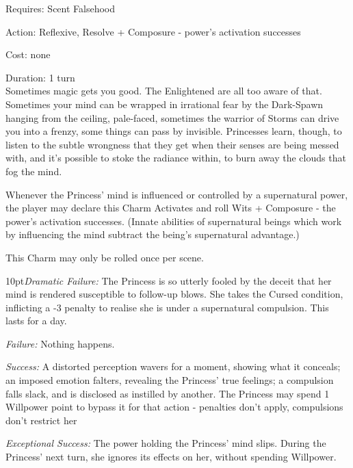 \noindent Requires: Scent Falsehood

\noindent Action: Reflexive, Resolve + Composure - power's activation successes

\noindent Cost: none

\noindent Duration: 1 turn \\

\noindent Sometimes magic gets you good. The Enlightened are all too aware of that. Sometimes your mind can be wrapped in irrational fear by the Dark-Spawn hanging from the ceiling, pale-faced, sometimes the warrior of Storms can drive you into a frenzy, some things can pass by invisible. Princesses learn, though, to listen to the subtle wrongness that they get when their senses are being messed with, and it's possible to stoke the radiance within, to burn away the clouds that fog the mind.

Whenever the Princess' mind is influenced or controlled by a supernatural power, the player may declare this Charm Activates and roll Wits + Composure - the power's activation successes. (Innate abilities of supernatural beings which work by influencing the mind subtract the being's supernatural advantage.) 

This Charm may only be rolled once per scene. 

    \begin{myindentpar}{10pt}\emph{Dramatic Failure:} The Princess is so utterly fooled by the deceit that her mind is rendered susceptible to follow-up blows. She takes the Cursed condition, inflicting a -3 penalty to realise she is under a supernatural compulsion. This lasts for a day. 

    \emph{Failure:} Nothing happens.

    \emph{Success:} A distorted perception wavers for a moment, showing what it conceals; an imposed emotion falters, revealing the Princess’ true feelings; a compulsion falls slack, and is disclosed as instilled by another. The Princess may spend 1 Willpower point to bypass it for that action - penalties don’t apply, compulsions don’t restrict her

    \emph{Exceptional Success:}  The power holding the Princess’ mind slips. During the Princess’ next turn, she ignores its effects on her, without spending Willpower.\end{myindentpar}


